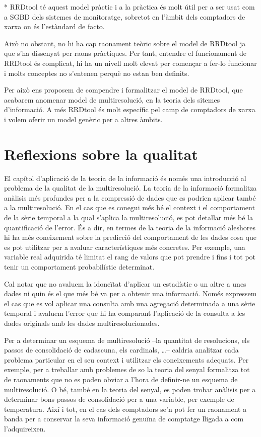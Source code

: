 * RRDtool té aquest model pràctic i a la pràctica és molt útil per a ser usat com a SGBD dels sistemes de monitoratge, sobretot en l'àmbit dels comptadors de xarxa on és l'estàndard de facto. 

Això no obstant, no hi ha cap raonament teòric sobre el model de RRDtool ja que s'ha dissenyat per raons pràctiques. Per tant, entendre el funcionament de RRDtool és complicat, hi ha un nivell molt elevat per començar a fer-lo funcionar i molts conceptes no s'entenen perquè no estan ben definits. 

Per això ens proposem de compendre i formalitzar el model de RRDtool, que acabarem anomenar model de multiresolució, en la teoria dels sitemes d'informació. A més RRDtool és molt específic pel camp de comptadors de xarxa i volem oferir un model genèric per a altres àmbits.  









\section{Reflexions sobre la qualitat}


El capítol d'aplicació de la teoria de la informació és només una
introducció al problema de la qualitat de la multiresolució.  La
teoria de la informació formalitza anàlisis més profundes per a la
compressió de dades que es podrien aplicar també a la multiresolució.
En el cas que es conegui més bé el context i el comportament de la
sèrie temporal a la qual s'aplica la multiresolució, es pot detallar
més bé la quantificació de l'error. És a dir, en termes de la teoria
de la informació aleshores hi ha més coneixement sobre la predicció
del comportament de les dades cosa que es pot utilitzar per a avaluar
característiques més concretes. Per exemple, una variable real
adquirida té limitat el rang de valors que pot prendre i fins i tot
pot tenir un comportament probabilístic determinat.



Cal notar que no avaluem la idoneïtat d'aplicar un estadístic o un
altre a unes dades ni quin és el que més bé va per a obtenir una
informació. Només expressem el cas que es vol aplicar una consulta amb
una agregació determinada a una sèrie temporal i avaluem l'error que
hi ha comparant l'aplicació de la consulta a les dades originals amb
les dades multiresolucionades. 

Per a determinar un esquema de multiresolució --la quantitat de
resolucions, els passos de consolidació de cadascuna, els cardinals,
\dots-- caldria analitzar cada problema particular en el seu context i
utilitzar els coneixements adequats. Per exemple, per a treballar amb
problemes de so la teoria del senyal formalitza tot de raonaments que
no es poden obviar a l'hora de definir-ne un esquema de
multiresolució.  O bé, també en la teoria del senyal, es poden trobar
anàlisis per a determinar bons passos de consolidació per a una
variable, per exemple de temperatura. Així i tot, en el cas dels
comptadors se'n pot fer un raonament a banda per a conservar la seva
informació genuïna de comptatge lligada a com l'adquireixen.


